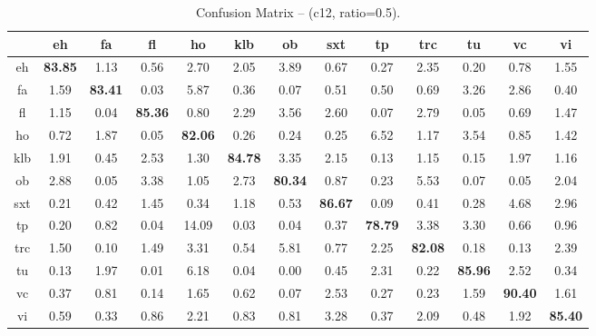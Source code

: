 \begin{table*}[h]
\begin{center}
\caption{Confusion Matrix -- (c12, ratio=0.5).}
\scriptsize
\begin{tabular}{ccccccccccccc}
\hline
  &  eh &    fa &   fl &    ho &   klb &    ob &   sxt &    tp &   trc &    tu &    vc &    vi \\
\hline
 eh & \textbf{83.85} &  1.13 &  0.56 &  2.70 &  2.05 &  3.89 &  0.67 &  0.27 &  2.35 &  0.20 &  0.78 &  1.55 \\
 fa &  1.59 & \textbf{83.41} &  0.03 &  5.87 &  0.36 &  0.07 &  0.51 &  0.50 &  0.69 &  3.26 &  2.86 &  0.40 \\
 fl & 1.15 &  0.04 & \textbf{85.36} &  0.80 &  2.29 &  3.56 &  2.60 &  0.07 &  2.79 &  0.05 &  0.69 &  1.47 \\
 ho &  0.72 &  1.87 &  0.05 & \textbf{82.06} &  0.26 &  0.24 &  0.25 &  6.52 &  1.17 &  3.54 &  0.85 &  1.42 \\
 klb &  1.91 &  0.45 &  2.53 &  1.30 & \textbf{84.78} &  3.35 &  2.15 &  0.13 &  1.15 &  0.15 &  1.97 &  1.16 \\
 ob &  2.88 &  0.05 &  3.38 &  1.05 &  2.73 & \textbf{80.34} &  0.87 &  0.23 &  5.53 &  0.07 &  0.05 &  2.04 \\
 sxt &  0.21 &  0.42 &  1.45 &  0.34 &  1.18 &  0.53 & \textbf{86.67} &  0.09 &  0.41 &  0.28 &  4.68 &  2.96 \\
 tp &  0.20 &  0.82 &  0.04 & 14.09 &  0.03 &  0.04 &  0.37 & \textbf{78.79} &  3.38 &  3.30 &  0.66 &  0.96 \\
 trc &  1.50 &  0.10 &  1.49 &  3.31 &  0.54 &  5.81 &  0.77 &  2.25 & \textbf{82.08} &  0.18 &  0.13 &  2.39 \\
 tu &  0.13 &  1.97 &  0.01 &  6.18 &  0.04 &  0.00 &  0.45 &  2.31 &  0.22 & \textbf{85.96} &  2.52 &  0.34 \\
 vc &  0.37 &  0.81 &  0.14 &  1.65 &  0.62 &  0.07 &  2.53 &  0.27 &  0.23 &  1.59 & \textbf{90.40} &  1.61 \\
 vi &  0.59 &  0.33 &  0.86 &  2.21 &  0.83 &  0.81 &  3.28 &  0.37 &  2.09 &  0.48 &  1.92 & \textbf{85.40} \\
\hline
\end{tabular}
\label{tab:things}
\end{center}
\end{table*}


